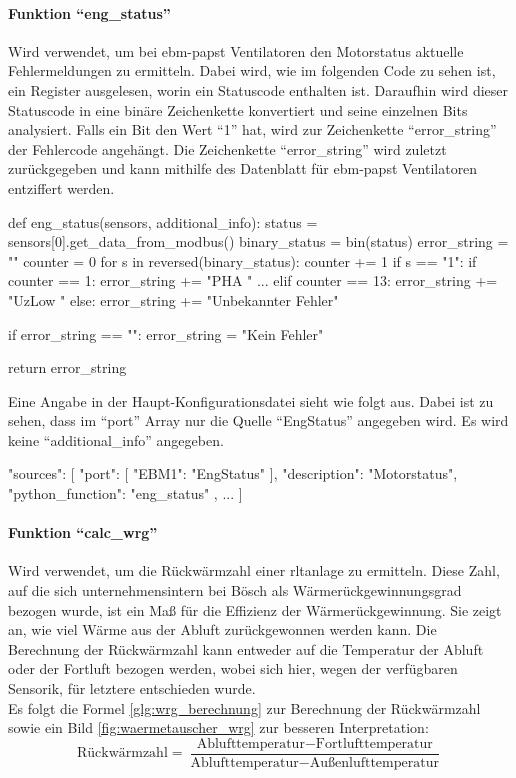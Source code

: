 \paragraph{Funktion \enquote{eng\_status}}
Wird verwendet, um bei ebm-papst Ventilatoren den Motorstatus \bzw aktuelle Fehlermeldungen zu ermitteln. Dabei wird, wie im folgenden Code zu sehen ist, ein Register ausgelesen, worin ein Statuscode enthalten ist. Daraufhin wird dieser Statuscode in eine binäre Zeichenkette konvertiert und seine einzelnen Bits analysiert. Falls ein Bit den Wert \enquote{1} hat, wird zur Zeichenkette \enquote{error\_string} der Fehlercode angehängt. Die Zeichenkette \enquote{error\_string} wird zuletzt zurückgegeben und kann mithilfe des Datenblatt für ebm-papst Ventilatoren \cite[vgl.][119]{ebmpapst:2020} entziffert werden. 

\begin{pythoncode}
def eng_status(sensors, additional_info):
	status = sensors[0].get_data_from_modbus()
	binary_status = bin(status)
	error_string = ""
	counter = 0
	for s in reversed(binary_status):
		counter += 1
		if s == "1":
			if counter == 1:
				error_string += "PHA "
			...
			elif counter == 13:
				error_string += "UzLow "
			else:
				error_string += "Unbekannter Fehler"
			
	if error_string == "":
		error_string = "Kein Fehler"
	
	return error_string
\end{pythoncode}

Eine Angabe in der Haupt-Konfigurationsdatei sieht wie folgt aus. Dabei ist zu sehen, dass im \enquote{port} Array nur die Quelle \enquote{EngStatus} angegeben wird. Es wird keine \enquote{additional\_info} angegeben.

\begin{jsoncode}
"sources": [
	{
		"port": [
			{"EBM1": "EngStatus"}
		],
		"description": "Motorstatus",
		"python_function": "eng_status"
	},
	...
]
\end{jsoncode}



\paragraph{Funktion \enquote{calc\_wrg}}
Wird verwendet, um die Rückwärmzahl einer \acs{rltanlage} zu ermitteln. Diese Zahl, auf die sich unternehmensintern bei Bösch als Wärmerückgewinnungsgrad bezogen wurde, ist ein Maß für die Effizienz der Wärmerückgewinnung. Sie zeigt an, wie viel Wärme aus der Abluft zurückgewonnen werden kann. Die Berechnung der Rückwärmzahl kann entweder auf die Temperatur der Abluft oder der Fortluft bezogen werden, wobei sich hier, wegen der verfügbaren Sensorik, für letztere entschieden wurde. \cite[vgl.][]{Klingenburg:o.J.}\\
Es folgt die Formel \eqref{glg:wrg_berechnung} zur Berechnung der Rückwärmzahl sowie ein Bild \ref{fig:waermetauscher_wrg} zur besseren Interpretation: 
\begin{equation}
	\text{Rückwärmzahl} = \frac{\text{Ablufttemperatur} - \text{Fortlufttemperatur}}{\text{Ablufttemperatur} - \text{Außenlufttemperatur}}
	\label{glg:wrg_berechnung}
\end{equation} 

